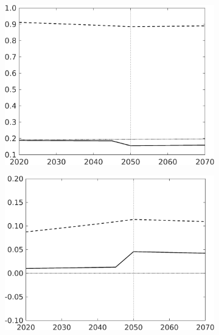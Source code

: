 \begin{figure}[h!!]
\begin{subfigure}[]{0.32\textwidth}
		\end{subfigure}	
		\begin{subfigure}[]{0.32\textwidth}
			\includegraphics[width=1\textwidth]{../../codding_model/own_basedOnFried/optimalPol_010922_revision/figures/all_13Sept22_Tplus30/sn_CompEffOPT_T_NoTaus_regime4_opteff_knspil1_spillover0_noskill0_sep0_xgrowth0_countec0_PV1_etaa0.79_lgd0_lff1.png}
		\end{subfigure}	
		\begin{subfigure}[]{0.32\textwidth}
			\includegraphics[width=1\textwidth]{../../codding_model/own_basedOnFried/optimalPol_010922_revision/figures/all_13Sept22_Tplus30/sg_CompEffOPT_T_NoTaus_regime4_opteff_knspil1_spillover0_noskill0_sep0_xgrowth0_countec0_PV1_etaa0.79_lgd0_lff1.png}
		\end{subfigure}
\end{figure}

